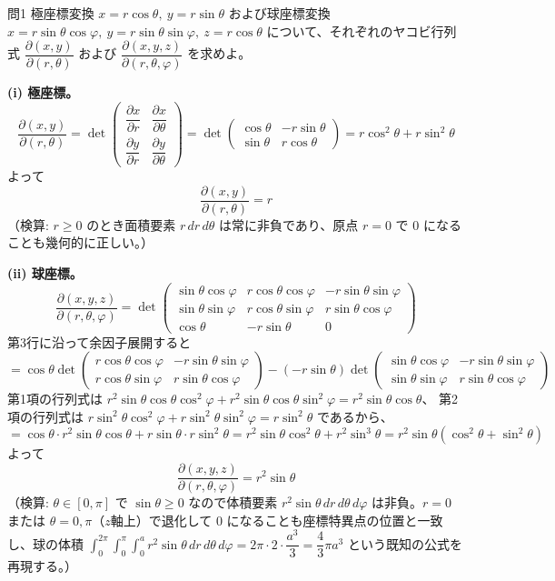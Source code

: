 \documentclass[a4paper,11pt]{article}
\begin{document}
\clearpage
\begin{mondaiboxS}{問1}
極座標変換 $x = r\cos\theta,\ y = r\sin\theta$ および球座標変換 $x = r\sin\theta\cos\varphi,\ y = r\sin\theta\sin\varphi,\ z = r\cos\theta$ について、それぞれのヤコビ行列式 $\dfrac{\partial(x,y)}{\partial(r,\theta)}$ および $\dfrac{\partial(x,y,z)}{\partial(r,\theta,\varphi)}$ を求めよ。
\end{mondaiboxS}
\kaitou
\textbf{(i) 極座標。}
\[
\frac{\partial(x,y)}{\partial(r,\theta)} = \det \begin{pmatrix} \dfrac{\partial x}{\partial r} & \dfrac{\partial x}{\partial \theta} \\[2mm] \dfrac{\partial y}{\partial r} & \dfrac{\partial y}{\partial \theta} \end{pmatrix}
= \det \begin{pmatrix} \cos\theta & -r\sin\theta \\ \sin\theta & r\cos\theta \end{pmatrix}
= r\cos^{2}\theta + r\sin^{2}\theta
\]
よって
\[
\boxed{\; \frac{\partial(x,y)}{\partial(r,\theta)} = r \;}
\]
（検算: $r \ge 0$ のとき面積要素 $r\, dr\, d\theta$ は常に非負であり、原点 $r=0$ で $0$ になることも幾何的に正しい。）

\medskip
\noindent
\textbf{(ii) 球座標。}
\[
\frac{\partial(x,y,z)}{\partial(r,\theta,\varphi)}
= \det \begin{pmatrix}
\sin\theta\cos\varphi & r\cos\theta\cos\varphi & -r\sin\theta\sin\varphi \\
\sin\theta\sin\varphi & r\cos\theta\sin\varphi & r\sin\theta\cos\varphi \\
\cos\theta & -r\sin\theta & 0
\end{pmatrix}
\]
第3行に沿って余因子展開すると
\[
= \cos\theta \det\begin{pmatrix} r\cos\theta\cos\varphi & -r\sin\theta\sin\varphi \\ r\cos\theta\sin\varphi & r\sin\theta\cos\varphi \end{pmatrix}
- (-r\sin\theta) \det\begin{pmatrix} \sin\theta\cos\varphi & -r\sin\theta\sin\varphi \\ \sin\theta\sin\varphi & r\sin\theta\cos\varphi \end{pmatrix}
\]
第1項の行列式は $r^{2}\sin\theta\cos\theta\cos^{2}\varphi + r^{2}\sin\theta\cos\theta\sin^{2}\varphi = r^{2}\sin\theta\cos\theta$、
第2項の行列式は $r\sin^{2}\theta\cos^{2}\varphi + r\sin^{2}\theta\sin^{2}\varphi = r\sin^{2}\theta$ であるから、
\[
= \cos\theta \cdot r^{2}\sin\theta\cos\theta + r\sin\theta \cdot r\sin^{2}\theta
= r^{2}\sin\theta\cos^{2}\theta + r^{2}\sin^{3}\theta
= r^{2}\sin\theta(\cos^{2}\theta + \sin^{2}\theta)
\]
よって
\[
\boxed{\; \frac{\partial(x,y,z)}{\partial(r,\theta,\varphi)} = r^{2}\sin\theta \;}
\]
（検算: $\theta \in [0,\pi]$ で $\sin\theta \ge 0$ なので体積要素 $r^{2}\sin\theta\, dr\, d\theta\, d\varphi$ は非負。$r=0$ または $\theta=0,\pi$（$z$軸上）で退化して $0$ になることも座標特異点の位置と一致し、球の体積 $\int_0^{2\pi}\!\!\int_0^{\pi}\!\!\int_0^{a} r^2\sin\theta\, dr\, d\theta\, d\varphi = 2\pi \cdot 2 \cdot \dfrac{a^3}{3} = \dfrac{4}{3}\pi a^3$ という既知の公式を再現する。）
\end{document}
